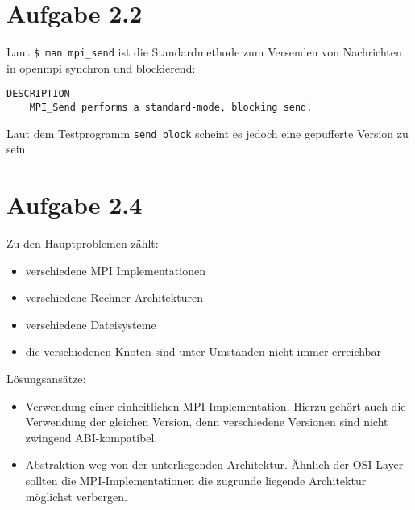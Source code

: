\documentclass[a4paper,
12pt,
BCOR12mm,
]{scrartcl}
\begin{document}
\section*{Aufgabe 2.2}
Laut \verb|$ man mpi_send| ist die Standardmethode zum Versenden von Nachrichten in
openmpi synchron und blockierend:
\begin{verbatim}
DESCRIPTION
	MPI_Send performs a standard-mode, blocking send.
\end{verbatim}

Laut dem Testprogramm \verb|send_block| scheint es jedoch eine gepufferte Version zu sein.



\section*{Aufgabe 2.4}
Zu den Hauptproblemen zählt:
\begin{itemize}
	\item verschiedene MPI Implementationen
	\item verschiedene Rechner-Architekturen
	\item verschiedene Dateisysteme
	\item die verschiedenen Knoten sind unter Umständen nicht immer erreichbar
\end{itemize}

Lösungsansätze:
\begin{itemize}
	\item Verwendung einer einheitlichen MPI-Implementation. Hierzu gehört auch die
		Verwendung der gleichen Version, denn verschiedene Versionen sind nicht zwingend
		ABI-kompatibel.
	\item Abstraktion weg von der unterliegenden Architektur. Ähnlich der OSI-Layer sollten
	die MPI-Implementationen die zugrunde liegende Architektur möglichst verbergen.
\end{itemize}

\nocite{*}

%
\end{document}
